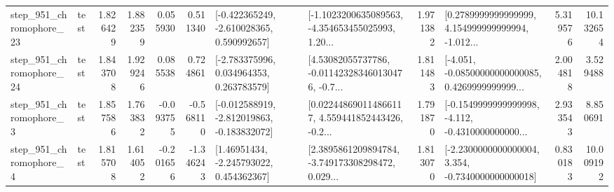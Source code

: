 \begin{tabular}{llrrrrllrlrr}
  step\_951\_chromophore\_23 &      test &      1.826429 &    1.882359 &      0.055930 &  0.511340 &   [-0.422365249, -2.610028365, 0.590992657] &  [-1.1023200635089563, -4.354653455025993, 1.20... &       1.971382 &  [0.2789999999999999, 4.154999999999994, -1.012... &            5.319576 &         10.132654 \\
  step\_951\_chromophore\_24 &      test &      1.843708 &    1.929246 &      0.085538 &  0.724861 &    [-2.783375996, 0.034964353, 0.263783579] &  [4.53082055737786, -0.011423283460130476, -0.7... &       1.811483 &  [-4.051, -0.08500000000000085, 0.4269999999999... &            2.004818 &          3.529488 \\
   step\_951\_chromophore\_3 &      test &      1.857586 &    1.763832 &     -0.093755 & -0.568110 &  [-0.012588919, -2.812019863, -0.183832072] &  [0.022448690114866117, 4.559441852443426, -0.2... &       1.791870 &  [-0.1549999999999998, -4.112, -0.4310000000000... &            2.933543 &          8.850691 \\
   step\_951\_chromophore\_4 &      test &      1.815708 &    1.614052 &     -0.201656 & -1.346243 &     [1.46951434, -2.245793022, 0.454362367] &  [2.3895861209894784, -3.749173308298472, 0.029... &       1.813070 &  [-2.2300000000000004, 3.354, -0.7340000000000018] &            0.830183 &         10.009192 \\
\bottomrule
\end{tabular}

